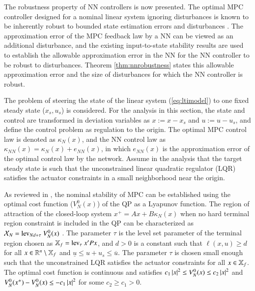\documentclass[preprint,5p, twocolumn, authoryear]{elsarticle}
\begin{document}
The robustness property of NN controllers 
is now presented. The optimal MPC controller
designed for a nominal linear system ignoring disturbances
is known to be inherently robust to bounded state 
estimation errors and disturbances
\citep*{heath:wills:2005, pannocchia:rawlings:wright:2011}. 
The approximation
error of the MPC feedback law by a NN can be viewed 
as an additional disturbance, and the existing
input-to-state stability
results \citep*{sontag:wang:1995} are used to establish the 
allowable approximation error in the NN for 
the NN controller to be robust to disturbances. 
Theorem \ref{thm:nnrobustness} states this 
allowable approximation error and the size 
of disturbances for which the NN controller is robust.

The problem of steering the state of the linear 
system (\ref{eq:ltimodel}) 
to one fixed steady state ($x_s, u_s$) is considered. 
For the analysis in this section, 
the state and control are transformed in deviation variables 
as $x := x - x_s$ and $u := u -u_s$,
and define the control problem as regulation to the origin.
The optimal MPC control law is denoted as $\kappa_N(x)$, 
and the NN control law as
$\kappa_{NN}(x) = \kappa_N(x) + e_{NN}(x)$, in which 
$e_{NN}(x)$ is the approximation error 
of the optimal control law by the network. Assume 
in the analysis that the target steady state 
is such that the unconstrained linear quadratic regulator (LQR)
satisfies the actuator constraints 
in a small neighborhood near the origin. 

As reviewed in \cite*{mayne:rawlings:rao:scokaert:2000},
the nominal stability of MPC can be established
using the optimal cost function ($V_N^0(x)$) of the QP
as a Lyapunov function.
The region of attraction of the closed-loop system 
$x^+ = Ax + B\kappa_N(x)$ when no hard terminal region 
constraint is included in the QP
can be characterized as $\mathcal{X}_N = \textnormal{lev}_{Nd + \tau} \
V_N^0(x)$ \citep*{limon:alamo:salas:camacho:2006}.
The parameter $\tau$ is the level set
parameter of the terminal region chosen as
$\mathbb{X}_f = \textnormal{lev}_{\tau} \ x'Px$, and $d > 0$
is a constant such that $\ell(x, u) \geq d$ for all 
$x \in \mathbb{R}^n \setminus \mathbb{X}_f$ and 
$\underline{u} \leq u+u_s \leq \overline{u}$.
The parameter $\tau$ is chosen small enough such that
the unconstrained LQR satisfies the actuator constraints 
for all $x \in \mathbb{X}_f$. The optimal cost 
function is continuous and satisfies 
$c_1\left| x \right|^2 \leq V_N^0(x) \leq c_2\left| x \right|^2$
and $V_N^0(x^+) - V_N^0(x) \leq -c_1\left| x \right|^2$ 
for some $c_2 \geq c_1 > 0$.
\end{document}

